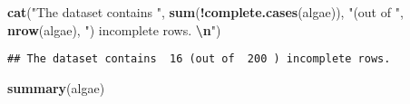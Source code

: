 \documentclass[
]{article}
\newenvironment{Shaded}{\begin{snugshade}}{\end{snugshade}}
\newcommand{\FunctionTok}[1]{\textcolor[rgb]{0.13,0.29,0.53}{\textbf{#1}}}
\newcommand{\NormalTok}[1]{#1}
\newcommand{\SpecialCharTok}[1]{\textcolor[rgb]{0.81,0.36,0.00}{\textbf{#1}}}
\newcommand{\StringTok}[1]{\textcolor[rgb]{0.31,0.60,0.02}{#1}}
\begin{document}
\begin{Shaded}
\begin{Highlighting}[]
\FunctionTok{cat}\NormalTok{(}\StringTok{"The dataset contains "}\NormalTok{, }\FunctionTok{sum}\NormalTok{(}\SpecialCharTok{!}\FunctionTok{complete.cases}\NormalTok{(algae)), }\StringTok{"(out of "}\NormalTok{, }\FunctionTok{nrow}\NormalTok{(algae), }\StringTok{") incomplete rows. }\SpecialCharTok{\textbackslash{}n}\StringTok{"}\NormalTok{)}
\end{Highlighting}
\end{Shaded}

\begin{verbatim}
## The dataset contains  16 (out of  200 ) incomplete rows.
\end{verbatim}

\begin{Shaded}
\begin{Highlighting}[]
\FunctionTok{summary}\NormalTok{(algae)}
\end{Highlighting}
\end{Shaded}
\end{document}
